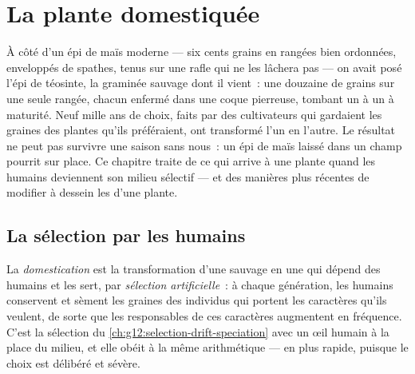 \chapter{La plante domestiquée}\label{ch:g12:domesticated-plants}

À côté d'un épi de maïs moderne --- six cents grains en rangées bien
ordonnées, enveloppés de spathes, tenus sur une rafle qui ne les
lâchera pas --- on avait posé l'épi de téosinte, la graminée sauvage
dont il vient~: une douzaine de grains sur une seule rangée, chacun
enfermé dans une coque pierreuse, tombant un à un à maturité. Neuf
mille ans de choix, faits par des cultivateurs qui gardaient les
graines des plantes qu'ils préféraient, ont transformé l'un en
l'autre. Le résultat ne peut pas survivre une saison sans nous~: un
épi de maïs laissé dans un champ pourrit sur place. Ce chapitre traite
de ce qui arrive à une plante quand les humains deviennent son milieu
sélectif --- et des manières plus récentes de modifier à dessein les
 d'une plante.

\section{La sélection par les humains}

\begin{definition}\label{def:g12:domesticated-plants:domestication}
La \emph{domestication} est la transformation
d'une  sauvage en une  qui dépend des humains et les sert,
par \emph{sélection artificielle}~: à
chaque génération, les humains conservent et sèment les graines des
individus qui portent les caractères qu'ils veulent, de sorte que les
 responsables de ces caractères augmentent en fréquence. C'est
la sélection du \cref{ch:g12:selection-drift-speciation} avec un œil
humain à la place du milieu, et elle obéit à la même
arithmétique --- en plus rapide, puisque le choix est délibéré et
sévère.
\end{definition}

